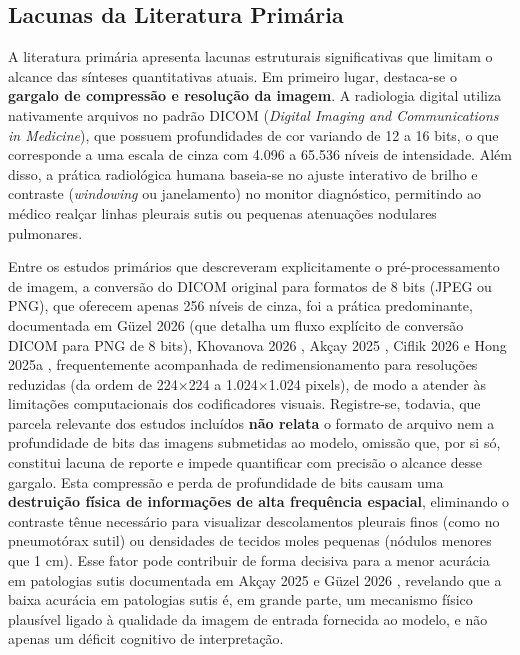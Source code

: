 \documentclass[12pt,a4paper]{article}
\begin{document}
\subsection{Lacunas da Literatura Primária}
A literatura primária apresenta lacunas estruturais significativas que limitam o alcance das sínteses quantitativas atuais. Em primeiro lugar, destaca-se o \textbf{gargalo de compressão e resolução da imagem}. A radiologia digital utiliza nativamente arquivos no padrão DICOM (\textit{Digital Imaging and Communications in Medicine}), que possuem profundidades de cor variando de 12 a 16 bits, o que corresponde a uma escala de cinza com 4.096 a 65.536 níveis de intensidade. Além disso, a prática radiológica humana baseia-se no ajuste interativo de brilho e contraste (\textit{windowing} ou janelamento) no monitor diagnóstico, permitindo ao médico realçar linhas pleurais sutis ou pequenas atenuações nodulares pulmonares. 

Entre os estudos primários que descreveram explicitamente o pré-processamento de imagem, a conversão do DICOM original para formatos de 8 bits (JPEG ou PNG), que oferecem apenas 256 níveis de cinza, foi a prática predominante, documentada em Güzel 2026 \cite{guzel} (que detalha um fluxo explícito de conversão DICOM para PNG de 8 bits), Khovanova 2026 \cite{khovanova}, Akçay 2025 \cite{akcay}, Ciflik 2026 \cite{ciflik} e Hong 2025a \cite{hong2025a}, frequentemente acompanhada de redimensionamento para resoluções reduzidas (da ordem de 224$\times$224 a 1.024$\times$1.024 pixels), de modo a atender às limitações computacionais dos codificadores visuais. Registre-se, todavia, que parcela relevante dos estudos incluídos \textbf{não relata} o formato de arquivo nem a profundidade de bits das imagens submetidas ao modelo, omissão que, por si só, constitui lacuna de reporte e impede quantificar com precisão o alcance desse gargalo. Esta compressão e perda de profundidade de bits causam uma \textbf{destruição física de informações de alta frequência espacial}, eliminando o contraste tênue necessário para visualizar descolamentos pleurais finos (como no pneumotórax sutil) ou densidades de tecidos moles pequenas (nódulos menores que 1 cm). Esse fator pode contribuir de forma decisiva para a menor acurácia em patologias sutis documentada em Akçay 2025 \cite{akcay} e Güzel 2026 \cite{guzel}, revelando que a baixa acurácia em patologias sutis é, em grande parte, um mecanismo físico plausível ligado à qualidade da imagem de entrada fornecida ao modelo, e não apenas um déficit cognitivo de interpretação.
\end{document}

